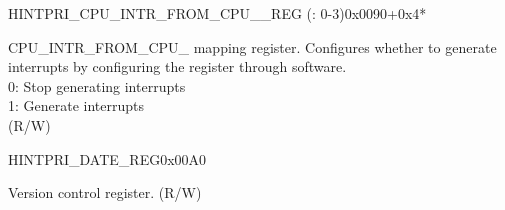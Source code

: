 \begin{register}{H}{INTPRI\_CPU\_INTR\_FROM\_CPU\_\_REG (: 0-3)}{0x0090+0x4*}\label{regdesc:INTPRICPUINTRFROMCPUNREG}
%
%
\regnewline%
\begin{regdesc}\begin{reglist}
\label{fielddesc:INTPRICPUINTRFROMCPUN}\item [INTPRI\_CPU\_INTR\_FROM\_CPU\_\regindex{n}] CPU\_INTR\_FROM\_CPU\_ mapping register. Configures whether to generate interrupts by configuring the register through software. \\
0: Stop generating interrupts \\
1: Generate interrupts \\(R/W)
\end{reglist}\end{regdesc}
\end{register}

\begin{register}{H}{INTPRI\_DATE\_REG}{0x00A0}\label{regdesc:INTPRIDATEREG}
%
%
\regnewline%
\begin{regdesc}\begin{reglist}
\label{fielddesc:INTPRIDATE}\item [INTPRI\_DATE] Version control register. (R/W)
\end{reglist}\end{regdesc}
\end{register}


